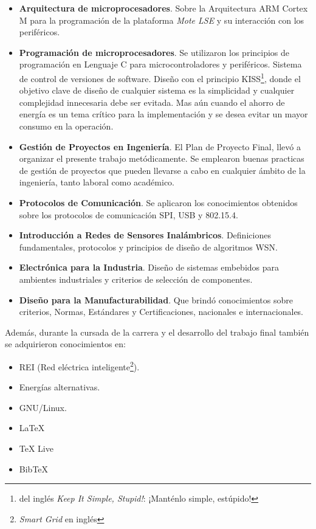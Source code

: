 \begin{itemize}
\item
\textbf{Arquitectura de microprocesadores}. Sobre la Arquitectura ARM Cortex M para la programación de la plataforma \textit{Mote LSE} y su interacción con los periféricos.

\item
\textbf{Programación de microprocesadores}. Se utilizaron los principios de programación en Lenguaje C para microcontroladores y periféricos. Sistema de control de versiones de software. Diseño con el principio KISS\footnote{del inglés \textit{Keep It Simple, Stupid!}: ¡Manténlo simple, estúpido!}, donde el objetivo clave de diseño de cualquier sistema es la simplicidad y cualquier complejidad innecesaria debe ser evitada. Mas aún cuando el ahorro de energía es un tema crítico para la implementación y se desea evitar un mayor consumo en la operación. 

\item
\textbf{Gestión de Proyectos en Ingeniería}. El Plan de Proyecto Final, llevó a organizar el presente trabajo metódicamente. Se emplearon buenas practicas de gestión de proyectos que pueden llevarse a cabo en cualquier ámbito de la ingeniería, tanto laboral como académico.

\item 
\textbf{Protocolos de Comunicación}. Se aplicaron los conocimientos obtenidos sobre los protocolos de comunicación SPI, USB y 802.15.4.

\item 
\textbf{Introducción a Redes de Sensores Inalámbricos}. Definiciones fundamentales, protocolos y principios de diseño de algoritmos WSN.

\item 
\textbf{Electrónica para la Industria}. Diseño de sistemas embebidos para ambientes industriales y criterios de selección de componentes.

\item 
\textbf{Diseño para la Manufacturabilidad}. Que brindó conocimientos sobre criterios, Normas, Estándares y Certificaciones, nacionales e internacionales. 
\end{itemize}
\medskip

\noindent Además, durante la cursada de la carrera y el desarrollo del trabajo final también se adquirieron conocimientos en:

\begin{itemize}
	\item REI (Red eléctrica inteligente\footnote{\textit{Smart Grid} en inglés}).
	\item Energías alternativas.	
	\item GNU/Linux.
	\item \LaTeX \citep{LaTeX}
	\item TeX Live \citep{TeXLive}
	\item BibTeX \citep{BibTeX}
	
\end{itemize}

